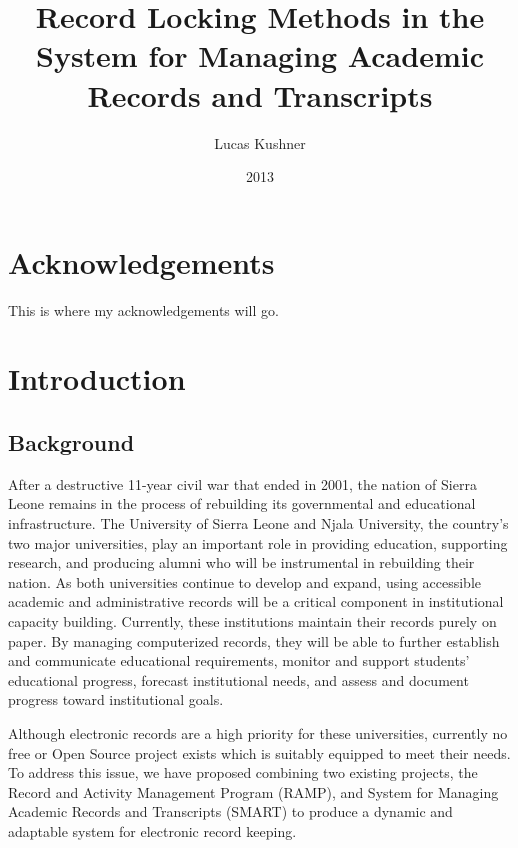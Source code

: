 \documentclass[12pt]{article}
\title{Record Locking Methods in the System for Managing Academic Records and Transcripts}
\author{Lucas Kushner}
\date{2013}
\begin{document}
\begin{titlepage}
    \maketitle
    \thispagestyle{empty}
\end{titlepage}

\newpage\null\thispagestyle{empty}\newpage

\doublespace

\section*{Acknowledgements}
This is where my acknowledgements will go.

\newpage

\tableofcontents

\newpage
{}
\section{Introduction}

\subsection{Background}

After a destructive 11-year civil war that ended in 2001, the nation of Sierra Leone remains in the process of rebuilding its governmental and educational infrastructure. The University of Sierra Leone and Njala University, the country’s two major universities, play an important role in providing education, supporting research, and producing alumni who will be instrumental in rebuilding their nation. As both universities continue to develop and expand, using accessible academic and administrative records will be a critical component in institutional capacity building. Currently, these institutions maintain their records purely on paper. By managing computerized records, they will be able to further establish and communicate educational requirements, monitor and support students' educational progress, forecast institutional needs, and assess and document progress toward institutional goals.

Although electronic records are a high priority for these universities, currently no free or Open Source project exists which is suitably equipped to meet their needs. To address this issue, we have proposed combining two existing projects, the Record and Activity Management Program (RAMP), and System for Managing Academic Records and Transcripts (SMART) to produce a dynamic and adaptable system for electronic record keeping.
\end{document}
